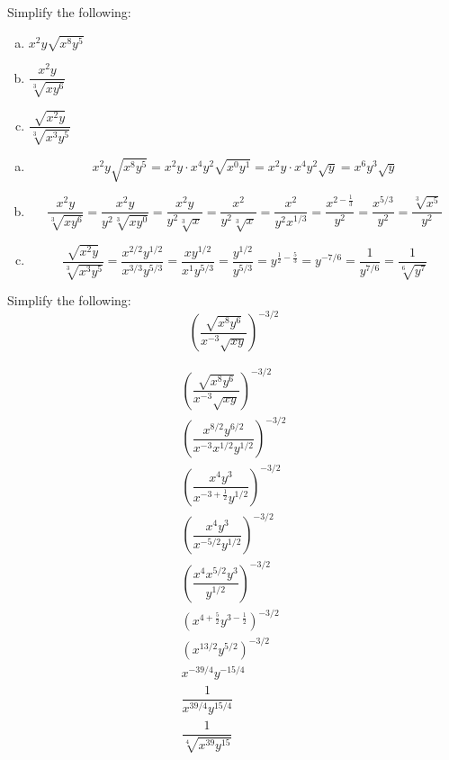 \documentclass[11pt,letterpaper]{article}
\begin{document}
\newpage



 Simplify the following:
	\begin{enumerate}[(a)]
	\item $x^2 y \sqrt{x^8 y^5}$
	\item $\dfrac{x^2 y}{\sqrt[3]{x y^6}}$
	\item $\dfrac{\sqrt{x^2 y}}{\sqrt[3]{x^3 y^5}}$
	\end{enumerate} \pspace

\sol 
\begin{enumerate}[(a)]
\item 
	\[
	x^2 y \sqrt{x^8 y^5}= x^2 y \cdot x^4 y^2 \sqrt{x^0 y^1}= x^2 y \cdot x^4 y^2 \sqrt{y}= x^6 y^3 \sqrt{y}
	\] \pspace

\item 
	\[
	\dfrac{x^2 y}{\sqrt[3]{x y^6}}= \dfrac{x^2 y}{y^2 \sqrt[3]{x y^0}}= \dfrac{x^2 y}{y^2 \sqrt[3]{x}}= \dfrac{x^2}{y^2 \sqrt[3]{x}}= \dfrac{x^2}{y^2 x^{1/3}}= \dfrac{x^{2 - \frac{1}{3}}}{y^2}= \dfrac{x^{5/3}}{y^2}= \dfrac{\sqrt[3]{x^5}}{y^2}
	\] \pspace

\item 
	\[
	\dfrac{\sqrt{x^2 y}}{\sqrt[3]{x^3 y^5}}= \dfrac{x^{2/2} y^{1/2}}{x^{3/3} y^{5/3}}= \dfrac{x y^{1/2}}{x^1 y^{5/3}}= \dfrac{y^{1/2}}{y^{5/3}}= y^{\frac{1}{2} - \frac{5}{3}}= y^{-7/6}= \dfrac{1}{y^{7/6}}= \dfrac{1}{\sqrt[6]{y^7}}
	\] 
\end{enumerate}



\newpage



 Simplify the following:
	\[
	\left( \dfrac{\sqrt{x^8 y^6}}{x^{-3} \sqrt{x y}} \right)^{-3/2}
	\] \pspace

\sol 
	\[
	\begin{gathered}
	\left( \dfrac{\sqrt{x^8 y^6}}{x^{-3} \sqrt{x y}} \right)^{-3/2} \\[0.3cm]
	\left( \dfrac{x^{8/2} y^{6/2}}{x^{-3} x^{1/2} y^{1/2}} \right)^{-3/2} \\[0.3cm]
	\left( \dfrac{x^4 y^3}{x^{-3 + \frac{1}{2}} y^{1/2}} \right)^{-3/2} \\[0.3cm]
	\left( \dfrac{x^4 y^3}{x^{-5/2} y^{1/2}} \right)^{-3/2} \\[0.3cm]
	\left( \dfrac{x^4 x^{5/2} y^3}{y^{1/2}} \right)^{-3/2} \\[0.3cm]
	\left( x^{4 + \frac{5}{2}} y^{3 - \frac{1}{2}} \right)^{-3/2} \\[0.3cm]
	\left( x^{13/2} y^{5/2} \right)^{-3/2} \\[0.3cm]
	x^{-39/4} y^{-15/4} \\[0.3cm]
	\dfrac{1}{x^{39/4} y^{15/4}} \\[0.3cm]
	\dfrac{1}{\sqrt[4]{x^{39} y^{15}}}
	\end{gathered}
	\]
\end{document}
